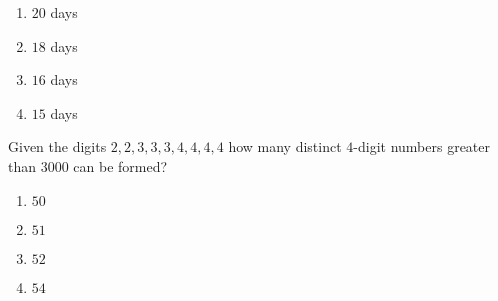     \begin{enumerate}
        \item $20$ days
        \item $18$ days
        \item $16$ days
        \item $15$ days
    \end{enumerate}

    \item Given the digits $2, 2, 3, 3, 3, 4, 4, 4, 4$ how many distinct $4$-digit numbers greater than $3000$ can be formed?

    \begin{enumerate}
        \item $50$
        \item $51$
        \item $52$
        \item $54$
    \end{enumerate}




    



